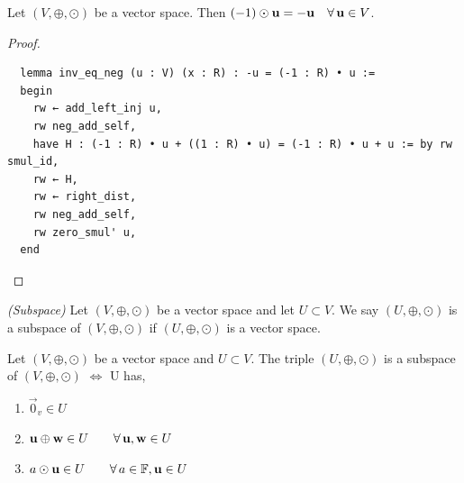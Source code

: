 \documentclass{article}
\begin{document}
\begin{nlemma}
  Let $(V, \oplus,\odot)$ be a vector space. Then $(-1) \odot \boldsymbol{\mathbf{u}} = - \boldsymbol{\mathbf{u}} \quad\forall\, \boldsymbol{\mathbf{u}} \in V$.
\end{nlemma}
\begin{proof}
  \begin{lstlisting}
  lemma inv_eq_neg (u : V) (x : R) : -u = (-1 : R) • u :=
  begin
    rw ← add_left_inj u,
    rw neg_add_self,
    have H : (-1 : R) • u + ((1 : R) • u) = (-1 : R) • u + u := by rw smul_id,
    rw ← H,
    rw ← right_dist,
    rw neg_add_self,
    rw zero_smul' u,
  end
  \end{lstlisting}
\end{proof}


\begin{ndefi}{\textit{(Subspace)}}
  Let $(V, \oplus,\odot)$ be a vector space and let $U \subset V$. We say $(U, \oplus,\odot)$ is a subspace of $(V, \oplus,\odot)$ if $(U, \oplus,\odot)$ is a vector space.
\end{ndefi}

\begin{nlemma}
  Let $(V, \oplus, \odot)$ be a vector space and $U\subset V$. The triple $(U, \oplus,\odot)$ is a subspace of $(V, \oplus,\odot)$ $\iff$ U has,
  \begin{enumerate}
    \item $\vec 0_v \in U$
    \item $\boldsymbol{\mathbf{u}} \oplus \boldsymbol{\mathbf{w}} \in U \qquad \forall\, \boldsymbol{\mathbf{u}}, \boldsymbol{\mathbf{w}} \in U$
    \item $a\odot\boldsymbol{\mathbf{u}} \in U \qquad \forall\, a\in\mathbb{F}, \boldsymbol{\mathbf{u}} \in U$
  \end{enumerate}
\end{nlemma}
\end{document}
